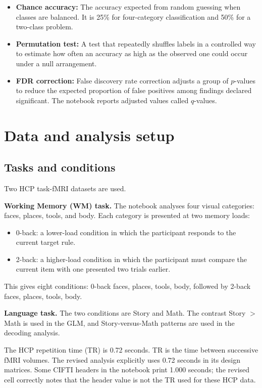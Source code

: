 \documentclass[11pt,a4paper]{article}
\begin{document}
\begin{itemize}
    \item \textbf{Chance accuracy:} The accuracy expected from random guessing when classes are balanced. It is 25\% for four-category classification and 50\% for a two-class problem.
    \item \textbf{Permutation test:} A test that repeatedly shuffles labels in a controlled way to estimate how often an accuracy as high as the observed one could occur under a null arrangement.
    \item \textbf{FDR correction:} False discovery rate correction adjusts a group of \(p\)-values to reduce the expected proportion of false positives among findings declared significant. The notebook reports adjusted values called \(q\)-values.
\end{itemize}

\section{Data and analysis setup}

\subsection{Tasks and conditions}

Two HCP task-fMRI datasets are used.

\textbf{Working Memory (WM) task.} The notebook analyses four visual categories: faces, places, tools, and body. Each category is presented at two memory loads:
\begin{itemize}
    \item 0-back: a lower-load condition in which the participant responds to the current target rule.
    \item 2-back: a higher-load condition in which the participant must compare the current item with one presented two trials earlier.
\end{itemize}
This gives eight conditions: 0-back faces, places, tools, body, followed by 2-back faces, places, tools, body.

\textbf{Language task.} The two conditions are Story and Math. The contrast Story \(>\) Math is used in the GLM, and Story-versus-Math patterns are used in the decoding analysis.

The HCP repetition time (TR) is 0.72 seconds. TR is the time between successive fMRI volumes. The revised analysis explicitly uses 0.72 seconds in its design matrices. Some CIFTI headers in the notebook print 1.000 seconds; the revised cell correctly notes that the header value is not the TR used for these HCP data.
\end{document}
